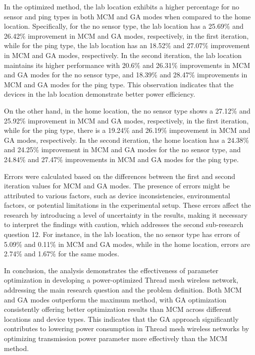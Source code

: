 In the optimized method, the lab location exhibits a higher percentage for no sensor and ping types in both \gls{MCM} and \gls{GA} modes when compared to the home location. Specifically, for the no sensor type, the lab location has a 25.69\% and 26.42\% improvement in \gls{MCM} and \gls{GA} modes, respectively, in the first iteration, while for the ping type, the lab location has an 18.52\% and 27.07\% improvement in \gls{MCM} and \gls{GA} modes, respectively. In the second iteration, the lab location maintains its higher performance with 20.6\% and 26.31\% improvements in \gls{MCM} and \gls{GA} modes for the no sensor type, and 18.39\% and 28.47\% improvements in \gls{MCM} and \gls{GA} modes for the ping type. This observation indicates that the devices in the lab location demonstrate better power efficiency.

On the other hand, in the home location, the no sensor type shows a 27.12\% and 25.92\% improvement in \gls{MCM} and \gls{GA} modes, respectively, in the first iteration, while for the ping type, there is a 19.24\% and 26.19\% improvement in \gls{MCM} and \gls{GA} modes, respectively. In the second iteration, the home location has a 24.38\% and 24.25\% improvement in \gls{MCM} and \gls{GA} modes for the no sensor type, and 24.84\% and 27.47\% improvements in \gls{MCM} and \gls{GA} modes for the ping type.

Errors were calculated based on the differences between the first and second iteration values for \gls{MCM} and \gls{GA} modes. The presence of errors might be attributed to various factors, such as device inconsistencies, environmental factors, or potential limitations in the experimental setup. These errors affect the research by introducing a level of uncertainty in the results, making it necessary to interpret the findings with caution, which addresses the second sub-research question 12. For instance, in the lab location, the no sensor type has errors of 5.09\% and 0.11\% in \gls{MCM} and \gls{GA} modes, while in the home location, errors are 2.74\% and 1.67\% for the same modes.

In conclusion, the analysis demonstrates the effectiveness of parameter optimization in developing a power-optimized Thread mesh wireless network, addressing the main research question and the problem definition. Both \gls{MCM} and \gls{GA} modes outperform the maximum method, with \gls{GA} optimization consistently offering better optimization results than \gls{MCM} across different locations and device types. This indicates that the \gls{GA} approach significantly contributes to lowering power consumption in Thread mesh wireless networks by optimizing transmission power parameter more effectively than the \gls{MCM} method.

